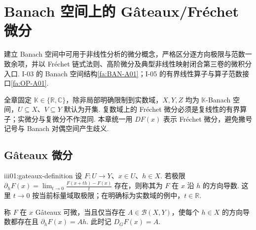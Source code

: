 \chapter{Banach 空间上的 Gâteaux/Fréchet 微分}\label{chap:III-01}
\FAChapterOpening
{建立 Banach 空间中可用于非线性分析的微分概念，严格区分逐方向极限与范数一致余项，并以 Fréchet 链式法则、高阶微分及典型非线性映射闭合第三卷的微积分入口.}
{I-03 的 Banach 空间结构\autoref{fa:BAN-A01}；I-05 的有界线性算子与算子范数接口\autoref{fa:OP-A01}.}
{\begin{center}
\end{center}}

全章固定 \(\displaystyle\mathbb K\in\{\mathbb R,\mathbb C\}\)，除非局部明确限制到实数域，\(\displaystyle X,Y,Z\) 均为 \(\displaystyle\mathbb K\)-Banach 空间，\(\displaystyle U\subseteq X\)、\(\displaystyle V\subseteq Y\) 默认为开集. 复数域上的 Fréchet 微分必须是复线性的有界算子；实微分与复微分不作混同. 本章统一用 \(\displaystyle DF(x)\) 表示 Fréchet 微分，避免撇号记号与 Banach 对偶空间产生歧义.

\section{Gâteaux 微分}\label{sec:iii01-gateaux}

\begin{FADefinition}{iii01:gateaux-definition}
设 \(\displaystyle F:U\to Y\)、\(\displaystyle x\in U\)、\(\displaystyle h\in X\). 若极限
\(\displaystyle \partial_hF(x) = \lim_{t\to0}\frac{F(x+th)-F(x)}{t}\)
存在，则称其为 \(\displaystyle F\) 在 \(\displaystyle x\) 沿 \(\displaystyle h\) 的方向导数. 这里 \(\displaystyle t\to0\) 按当前标量域取极限；在明确标为实数域的例中，\(\displaystyle t\in\mathbb R\).

称 \(\displaystyle F\) 在 \(\displaystyle x\) Gâteaux 可微，当且仅当存在 \(\displaystyle A\in\mathcal B(X,Y)\)，使每个 \(\displaystyle h\in X\) 的方向导数都存在且
\(\displaystyle \partial_hF(x)=Ah.\)
此时记 \(\displaystyle D_GF(x)=A\).
\end{FADefinition}

